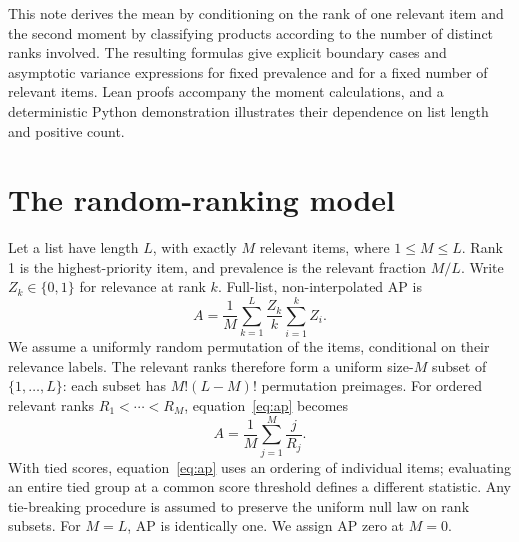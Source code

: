 \documentclass[10pt]{article}
\begin{document}
This note derives the mean by conditioning on the rank of one relevant item and the second moment by classifying products according to the number of distinct ranks involved.
The resulting formulas give explicit boundary cases and asymptotic variance expressions for fixed prevalence and for a fixed number of relevant items.
Lean proofs accompany the moment calculations, and a deterministic Python demonstration illustrates their dependence on list length and positive count.

\newpage
\section{The random-ranking model}
Let a list have length $L$, with exactly $M$ relevant items, where $1\le M\le L$.
Rank 1 is the highest-priority item, and prevalence is the relevant fraction $M/L$.
Write $Z_k\in\{0,1\}$ for relevance at rank $k$.
Full-list, non-interpolated AP is
\begin{equation}\label{eq:ap}
 A=\frac{1}{M}\sum_{k=1}^{L}\frac{Z_k}{k}\sum_{i=1}^{k}Z_i.
\end{equation}
We assume a uniformly random permutation of the items, conditional on their relevance labels.
The relevant ranks therefore form a uniform size-$M$ subset of $\{1,\ldots,L\}$: each subset has $M!(L-M)!$ permutation preimages.
For ordered relevant ranks $R_1<\cdots<R_M$, equation~\eqref{eq:ap} becomes
\begin{equation}\label{eq:ranks}
 A=\frac{1}{M}\sum_{j=1}^{M}\frac{j}{R_j}.
\end{equation}
With tied scores, equation~\eqref{eq:ap} uses an ordering of individual items; evaluating an entire tied group at a common score threshold defines a different statistic.
Any tie-breaking procedure is assumed to preserve the uniform null law on rank subsets.
For $M=L$, AP is identically one.
We assign AP zero at $M=0$.
\end{document}
